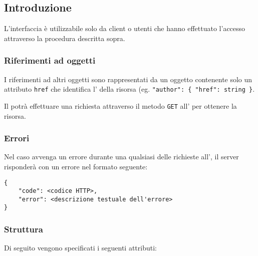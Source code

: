\subsection{Introduzione}

    L'interfaccia  è utilizzabile solo da client o utenti che hanno effettuato l'accesso
    attraverso la procedura descritta sopra.
    
    \subsubsection{Riferimenti ad oggetti}
    \par I riferimenti ad altri oggetti sono rappresentati da un oggetto  contenente solo un attributo \texttt{href} che identifica l' della risorsa (eg. \texttt{"author": \{ "href": string \}}.
    
    \par Il  potrà effettuare una richiesta attraverso il metodo \texttt{GET} all' per ottenere la risorsa.
    

    \subsubsection{Errori}

        Nel caso avvenga un errore durante una qualsiasi delle richieste all', il server risponderà
        con un errore nel formato  seguente:

        \begin{lstlisting}[basicstyle={\ttfamily}]
{
    "code": <codice HTTP>,
    "error": <descrizione testuale dell'errore>
}
        \end{lstlisting}

    \subsubsection{Struttura}

        Di seguito vengono specificati i seguenti attributi:

